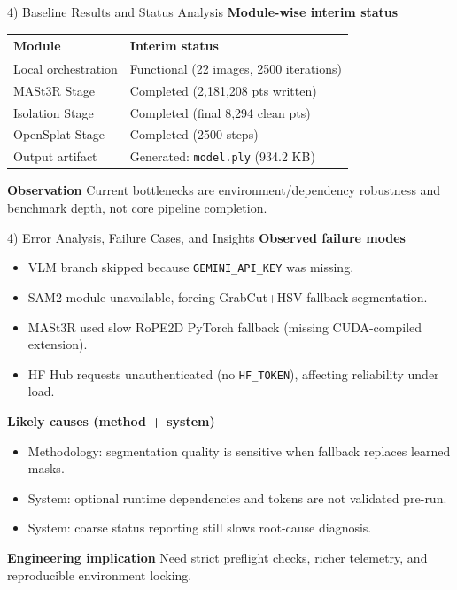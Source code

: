 \documentclass[aspectratio=169]{beamer}
\begin{document}
\begin{frame}{4) Baseline Results and Status Analysis}
\textbf{Module-wise interim status}
\begin{table}[h]
\centering
\begin{tabular}{p{2.8cm}p{4.8cm}}
\toprule
Module & Interim status \\
\midrule
Local orchestration & Functional (22 images, 2500 iterations) \\
MASt3R Stage & Completed (2,181,208 pts written) \\
Isolation Stage & Completed (final 8,294 clean pts) \\
OpenSplat Stage & Completed (2500 steps) \\
Output artifact & Generated: \texttt{model.ply} (934.2 KB) \\
\bottomrule
\end{tabular}
\end{table}

\textbf{Observation}
Current bottlenecks are environment/dependency robustness and benchmark depth, not core pipeline completion.
\end{frame}

\begin{frame}{4) Error Analysis, Failure Cases, and Insights}
\textbf{Observed failure modes}
\begin{itemize}
  \item VLM branch skipped because \texttt{GEMINI\_API\_KEY} was missing.
  \item SAM2 module unavailable, forcing GrabCut+HSV fallback segmentation.
  \item MASt3R used slow RoPE2D PyTorch fallback (missing CUDA-compiled extension).
  \item HF Hub requests unauthenticated (no \texttt{HF\_TOKEN}), affecting reliability under load.
\end{itemize}

\vspace{0.5em}
\textbf{Likely causes (method + system)}
\begin{itemize}
  \item Methodology: segmentation quality is sensitive when fallback replaces learned masks.
  \item System: optional runtime dependencies and tokens are not validated pre-run.
  \item System: coarse status reporting still slows root-cause diagnosis.
\end{itemize}

\vspace{0.5em}
\textbf{Engineering implication}
Need strict preflight checks, richer telemetry, and reproducible environment locking.
\end{frame}
\end{document}
